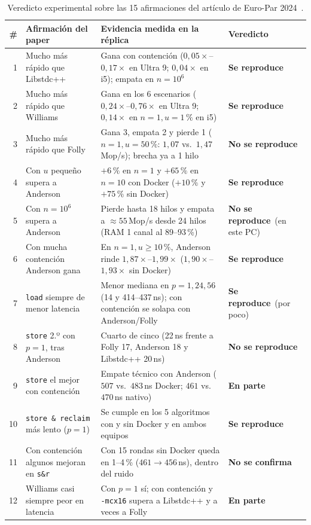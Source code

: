 \documentclass[11pt,a4paper]{article}
\newcommand{\si}{\textcolor{ok}{\textbf{Se reproduce}}}
\newcommand{\parcial}{\textcolor{acento}{\textbf{En parte}}}
\newcommand{\no}{\textcolor{mal}{\textbf{No se reproduce}}}
\newcommand{\noconf}{\textcolor{gris}{\textbf{No se confirma}}}
\begin{document}
\begin{table}[H]
\centering
\caption{Veredicto experimental sobre las 15 afirmaciones del artículo de Euro-Par 2024~\cite{dewolff2024waitfree}.}
\label{tab:veredicto}
\footnotesize
\begin{tabularx}{\linewidth}{@{}r >{\raggedright\arraybackslash}p{4.6cm} >{\raggedright\arraybackslash}X l@{}}
\toprule
\textbf{\#} & \textbf{Afirmación del paper} & \textbf{Evidencia medida en la réplica} & \textbf{Veredicto} \\
\midrule
1 & Mucho más rápido que Libstdc++ & Gana con contención ($0,05\times$--$0,17\times$ en Ultra 9; $0,04\times$ en i5); empata en $n=10^6$ & \si \\
2 & Mucho más rápido que Williams & Gana en los 6 escenarios ($0,24\times$--$0,76\times$ en Ultra 9; $0,14\times$ en $n=1,u=1\,\%$ en i5) & \si \\
3 & Mucho más rápido que Folly & Gana 3, empata 2 y pierde 1 ($n=1,u=50\,\%$: $1,07$ vs.\ $1,47$\,Mop/s); brecha ya a 1 hilo & \no \\
4 & Con $u$ pequeño supera a Anderson & $+6\,\%$ en $n=1$ y $+65\,\%$ en $n=10$ con Docker ($+10\,\%$ y $+75\,\%$ sin Docker) & \si \\
5 & Con $n=10^6$ supera a Anderson & Pierde hasta 18 hilos y empata a $\approx 55$\,Mop/s desde 24 hilos (RAM 1 canal al 89--93\,\%) & \no\ (en este PC) \\
6 & Con mucha contención Anderson gana & En $n=1, u \ge 10\,\%$, Anderson rinde $1,87\times$--$1,99\times$ ($1,90\times$--$1,93\times$ sin Docker) & \si \\
7 & \texttt{load} siempre de menor latencia & Menor mediana en $p=1, 24, 56$ (14 y 414--437\,ns); con contención se solapa con Anderson/Folly & \si\ (por poco) \\
8 & \texttt{store} 2.º con $p=1$, tras Anderson & Cuarto de cinco (22\,ns frente a Folly 17, Anderson 18 y Libstdc++ 20\,ns) & \no \\
9 & \texttt{store} el mejor con contención & Empate técnico con Anderson ($507$ vs.\ $483$\,ns Docker; $461$ vs.\ $470$\,ns nativo) & \parcial \\
10 & \texttt{store \& reclaim} más lento ($p=1$) & Se cumple en los 5 algoritmos con y sin Docker y en ambos equipos & \si \\
11 & Con contención algunos mejoran en \texttt{s\&r} & Con 15 rondas sin Docker queda en 1--4\,\% ($461 \to 456$\,ns), dentro del ruido & \noconf \\
12 & Williams casi siempre peor en latencia & Con $p=1$ sí; con contención y \texttt{-mcx16} supera a Libstdc++ y a veces a Folly & \parcial \\

\end{tabularx}
\end{table}
\end{document}
